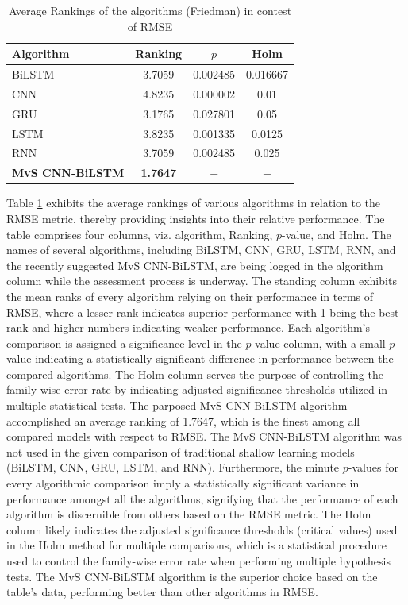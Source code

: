 \documentclass[a4paper,fleqn]{cas-dc}
\begin{document}
\begin{table}[!htp]
  \caption{Average Rankings of the algorithms (Friedman) in contest of RMSE}
  \centering
  \begin{tabular}{lccc}
  \hline
  Algorithm&Ranking&$p$&Holm\\\hline
  BiLSTM&3.7059&0.002485&0.016667\\
  CNN&4.8235&0.000002&0.01\\
  GRU&3.1765&0.027801&0.05\\
  LSTM&3.8235&0.001335&0.0125\\
  RNN&3.7059&0.002485&0.025\\
  \textbf{MvS CNN-BiLSTM}&\textbf{1.7647}&$-$ &$-$ \\\hline
\end{tabular}
\label{rank_rmse}
  \end{table}
  Table \ref{rank_rmse} exhibits the average rankings of various algorithms in relation to the RMSE metric, thereby providing insights into their relative performance. The table comprises four columns, viz. algorithm, Ranking, $p$-value, and Holm. The names of several algorithms, including BiLSTM, CNN, GRU, LSTM, RNN, and the recently suggested MvS CNN-BiLSTM, are being logged in the algorithm column while the assessment process is underway. The standing column exhibits the mean ranks of every algorithm relying on their performance in terms of RMSE, where a lesser rank indicates superior performance with 1 being the best rank and higher numbers indicating weaker performance. Each algorithm's comparison is assigned a significance level in the $p$-value column, with a small $p$-value indicating a statistically significant difference in performance between the compared algorithms. The Holm column serves the purpose of controlling the family-wise error rate by indicating adjusted significance thresholds utilized in multiple statistical tests. The parposed MvS CNN-BiLSTM algorithm accomplished an average ranking of 1.7647, which is the finest among all compared models with respect to RMSE. The MvS CNN-BiLSTM algorithm was not used in the given comparison of traditional shallow learning models (BiLSTM, CNN, GRU, LSTM, and RNN). Furthermore, the minute $p$-values for every algorithmic comparison imply a statistically significant variance in performance amongst all the algorithms, signifying that the performance of each algorithm is discernible from others based on the RMSE metric. The Holm column likely indicates the adjusted significance thresholds (critical values) used in the Holm method for multiple comparisons, which is a statistical procedure used to control the family-wise error rate when performing multiple hypothesis tests. The MvS CNN-BiLSTM algorithm is the superior choice based on the table's data, performing better than other algorithms in RMSE.
\end{document}
